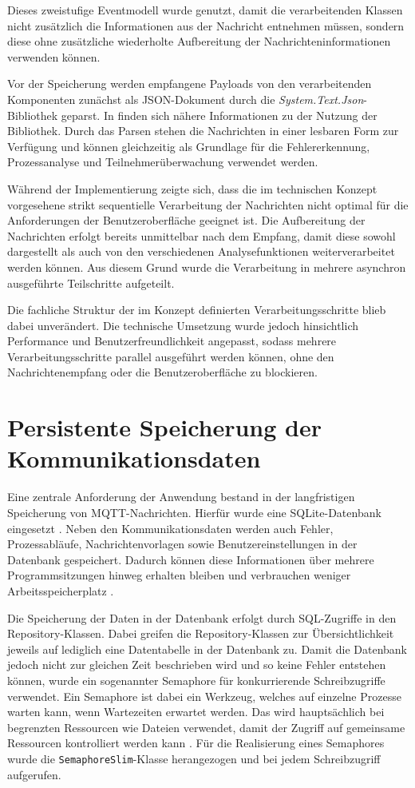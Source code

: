 Dieses zweistufige Eventmodell wurde genutzt, damit die verarbeitenden Klassen nicht zusätzlich die Informationen aus der Nachricht entnehmen müssen, sondern diese ohne zusätzliche wiederholte Aufbereitung der Nachrichteninformationen verwenden können. 

Vor der Speicherung werden empfangene Payloads von den verarbeitenden Komponenten zunächst als JSON-Dokument durch die \textit{System.Text.Json}-Bibliothek geparst. In \autocite{gewarrenHowDeserializeJSON} finden sich nähere Informationen zu der Nutzung der Bibliothek. Durch das Parsen stehen die Nachrichten in einer lesbaren Form zur Verfügung und können gleichzeitig als Grundlage für die Fehlererkennung, Prozessanalyse und Teilnehmerüberwachung verwendet werden.

Während der Implementierung zeigte sich, dass die im technischen Konzept vorgesehene strikt sequentielle Verarbeitung der Nachrichten nicht optimal für die Anforderungen der Benutzeroberfläche geeignet ist. Die Aufbereitung der Nachrichten erfolgt bereits unmittelbar nach dem Empfang, damit diese sowohl dargestellt als auch von den verschiedenen Analysefunktionen weiterverarbeitet werden können. Aus diesem Grund wurde die Verarbeitung in mehrere asynchron ausgeführte Teilschritte aufgeteilt.

Die fachliche Struktur der im Konzept definierten Verarbeitungsschritte blieb dabei unverändert. Die technische Umsetzung wurde jedoch hinsichtlich Performance und Benutzerfreundlichkeit angepasst, sodass mehrere Verarbeitungsschritte parallel ausgeführt werden können, ohne den Nachrichtenempfang oder die Benutzeroberfläche zu blockieren.
\section{Persistente Speicherung der Kommunikationsdaten}
Eine zentrale Anforderung der Anwendung bestand in der langfristigen Speicherung von MQTT-Nachrichten. Hierfür wurde eine SQLite-Datenbank eingesetzt \autocite{ajcvickersOverviewMicrosoftDataSqlite}. Neben den Kommunikationsdaten werden auch Fehler, Prozessabläufe, Nachrichtenvorlagen sowie Benutzereinstellungen in der Datenbank gespeichert. Dadurch können diese Informationen über mehrere Programmsitzungen hinweg erhalten bleiben und verbrauchen weniger Arbeitsspeicherplatz \autocite[2--4]{arulrajMultiTierBufferManagement2019}.

Die Speicherung der Daten in der Datenbank erfolgt durch SQL-Zugriffe in den Repository-Klassen. Dabei greifen die Repository-Klassen zur Übersichtlichkeit jeweils auf lediglich eine Datentabelle in der  Datenbank zu. Damit die Datenbank jedoch nicht zur gleichen Zeit beschrieben wird und so keine Fehler entstehen können, wurde ein sogenannter Semaphore für konkurrierende Schreibzugriffe verwendet. Ein Semaphore ist dabei ein Werkzeug, welches auf einzelne Prozesse warten kann, wenn Wartezeiten erwartet werden. Das wird hauptsächlich bei begrenzten Ressourcen wie Dateien verwendet, damit der Zugriff auf gemeinsame Ressourcen kontrolliert werden kann \autocite{billwagnerSemaphorUndSemaphoreSlim}. Für die Realisierung eines Semaphores wurde die \lstinline{SemaphoreSlim}-Klasse herangezogen und bei jedem Schreibzugriff aufgerufen.

